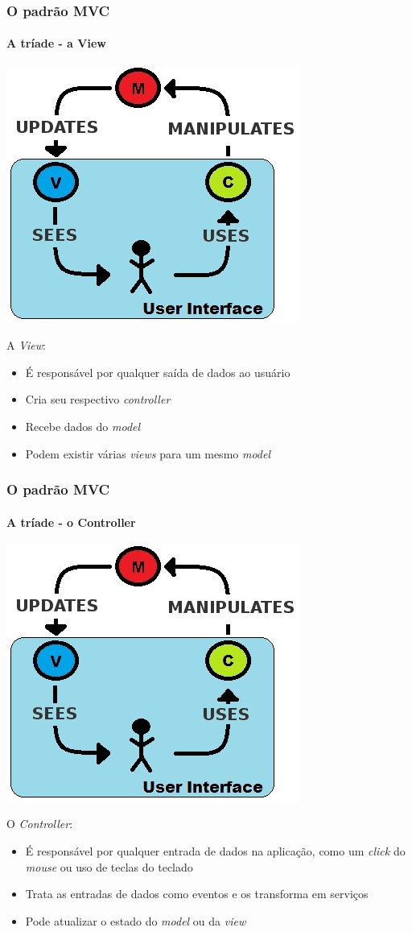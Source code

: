 \documentclass{beamer}
\begin{document}
\begin{frame}
\frametitle{O padrão MVC}
\framesubtitle{A tríade - a View}
\begin{center}
	\includegraphics[scale=0.4]{MVC.jpg}
\end{center}
A \textit{View}:
\begin{itemize}
  \item {É responsável por qualquer saída de dados ao usuário}
  \item {Cria seu respectivo \textit{controller}}
  \item {Recebe dados do \textit{model}}
  \item {Podem existir várias \textit{views} para um mesmo \textit{model}}
\end{itemize}
\end{frame}

\begin{frame} [shrink=10]
\frametitle{O padrão MVC}
\framesubtitle{A tríade - o Controller}
\begin{center}
	\includegraphics[scale=0.4]{MVC.jpg}
\end{center}
O \textit{Controller}:
\begin{itemize}
  \item {É responsável por qualquer entrada de dados na aplicação, como um \textit{click} do \textit{mouse} ou uso de teclas do teclado}
  \item {Trata as entradas de dados como eventos e os transforma em serviços}
  \item {Pode atualizar o estado do \textit{model} ou da \textit{view}}
\end{itemize}
\end{frame}
\end{document}
